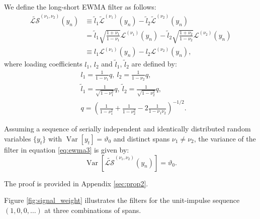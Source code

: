 \documentclass[hidelinks]{siamonline250211}
\DeclareMathOperator{\Var}{Var}
\begin{document}
\begin{definition} We define the long-short EWMA filter as follows:
	\begin{equation} \label{eq:ewma3} 
		\begin{split}
			\widetilde{\mathcal{LS}}^{(\nu_{1}, \nu_{2})}(y_{n})   & \equiv \widetilde{l}_{1} \widetilde{\mathcal{L}}^{(\nu_{1})} (y_{n}) - \widetilde{l}_{2}\widetilde{\mathcal{L}}^{(\nu_{2})} (y_{n}) \\
			&   = \widetilde{l}_{1}\sqrt{\frac{ 1+\nu_{1}   }{ 1-\nu_{1}}} \mathcal{L}^{(\nu_{1})} (y_{n}) - \widetilde{l}_{2}\sqrt{\frac{ 1+\nu_{2}   }{ 1-\nu_{2}}} \mathcal{L}^{(\nu_{2})} (y_{n})\\
			&   \equiv l_{1} \mathcal{L}^{(\nu_{1})} (y_{n}) - l_{2} \mathcal{L}^{(\nu_{2})} (y_{n}),
		\end{split}
	\end{equation}
	where loading coefficients $l_{1}$, $l_{2}$ and $\widetilde{l}_{1}$, $\widetilde{l}_{2}$ are defined by:
	\begin{equation} \label{eq:ewma3a} 
		\begin{split}
			& l_{1} =\frac{1}{ 1-\nu_{1} } q, \ l_{2} =\frac{1}{1-\nu_{2}} q,\\
			& \widetilde{l}_{1} =\frac{1}{\sqrt{ 1-\nu^{2}_{1}} } q, \ \widetilde{l}_{2} =\frac{1}{\sqrt{ 1-\nu^{2}_{2}} } q, \\ 
			& q = \left( \frac{1}{ 1-\nu^{2}_{1}}  + \frac{1}{ 1-\nu^{2}_{2} } - 2 \frac{1}{1-\nu_{1}\nu_{2}} \right)^{-1/2}.
		\end{split}
	\end{equation}
\end{definition}


\begin{proposition} \label{prop2} Assuming a sequence of serially independent and identically distributed random variables $\{y_t\}$ with $\Var[y_t]=\vartheta_{0}$ and distinct spans $\nu_{1}\neq\nu_{2}$, the variance of the filter in equation \eqref{eq:ewma3} is given by:
	\begin{equation} \label{eq:ewma3c} 
		\Var\left[ \widetilde{\mathcal{LS}}^{(\nu_{1}, \nu_{2})}(y_{n})  \right] = \vartheta_0.
	\end{equation}
\end{proposition}
The proof is provided in Appendix \ref{sec:prop2}.


Figure \ref{fig:signal_weight} illustrates the filters for the unit-impulse sequence $(1,0,0,\ldots)$ at three combinations of spans.
\end{document}
